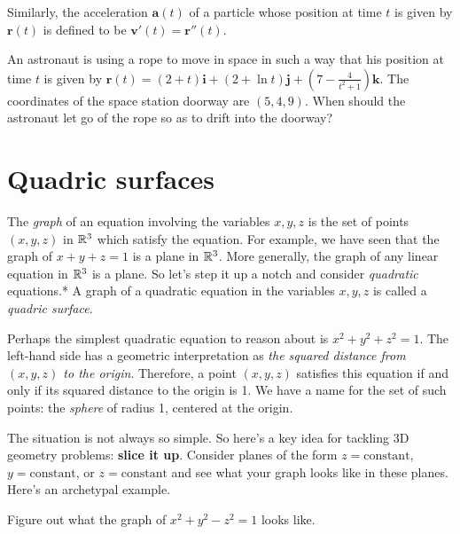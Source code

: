 \documentclass[svgnames]{watsonbook}
\begin{document}
Similarly, the acceleration $\mathbf{a}(t)$ of a particle whose
position at time $t$ is given by $\mathbf{r}(t)$ is defined to be
$\mathbf{v}'(t) = \mathbf{r}''(t)$. 

\begin{exercise}{}{}
  An astronaut is using a rope to move in space in such a way that his
  position at time $t$ is given by 
  $\mathbf{r}(t) = (2+t) \mathbf{i} + (2+\ln t) \mathbf{j} + \left( 7
    - \frac{4}{t^2+1}\right) \mathbf{k}$. The coordinates of the space
  station doorway are $(5,4,9)$. When should the astronaut let go of the
  rope so as to drift into the doorway? 
\end{exercise}

\section{Quadric surfaces} \label{sec:quadric_surfaces} 

The \textit{graph} of an equation involving the variables $x,y,z$ is
the set of points $(x,y,z)$ in $\mathbb{R}^3$ which satisfy the equation. For
example, we have seen that the graph of $x + y + z = 1$ is a plane in
$\mathbb{R}^3$. More generally, the graph of any linear equation in $\mathbb{R}^3$ is
a plane. So let's step it up a notch and consider \textit{quadratic}
equations.*  A graph of a quadratic
equation in the variables $x,y,z$ is called a \textit{quadric
  surface}. 

Perhaps the simplest quadratic equation to reason about is $x^2 + y^2 + z^2 =
1$. The left-hand side has a geometric interpretation as \textit{the
  squared distance from $(x,y,z)$ to the origin}. Therefore, a point $(x,y,z)$
satisfies this equation if and only if its squared distance to the
origin is 1. We have a name for the set of such points: the
\textit{sphere} of radius 1, centered at the origin.

The situation is not always so simple. So here's a key idea for
tackling 3D geometry problems: \textbf{slice it up}. Consider planes
of the form $z = \mathrm{constant}$, $y = \mathrm{constant}$, or
$z = \mathrm{constant}$ and see what your graph looks like in these
planes. Here's an archetypal example.

\begin{example}{}{}
  Figure out what the graph of $x^2 + y^2 - z^2 = 1$ looks like. 
\end{example}
\end{document}
